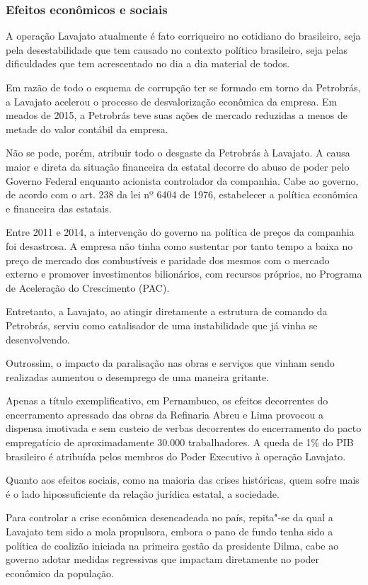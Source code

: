 {\subsubsection{Efeitos econômicos e sociais}

A operação Lavajato atualmente é fato corriqueiro no cotidiano do
brasileiro, seja pela desestabilidade que tem causado no contexto
político brasileiro, seja pelas dificuldades que tem acrescentado no dia
a dia material de todos.

Em razão de todo o esquema de corrupção ter se formado em torno da
Petrobrás, a Lavajato acelerou o processo de desvalorização econômica da
empresa. Em meados de 2015, a Petrobrás teve suas ações de mercado
reduzidas a menos de metade do valor contábil da empresa.

Não se pode, porém, atribuir todo o desgaste da Petrobrás à Lavajato. A
causa maior e direta da situação financeira da estatal decorre do abuso
de poder pelo Governo Federal enquanto acionista controlador da
companhia. Cabe ao governo, de acordo com o art. 238 da lei nº 6404 de
1976, estabelecer a política econômica e financeira das estatais.

Entre 2011 e 2014, a intervenção do governo na política de preços da
companhia foi desastrosa. A empresa não tinha como sustentar por tanto
tempo a baixa no preço de mercado dos combustíveis e paridade dos mesmos
com o mercado externo e promover investimentos bilionários, com recursos
próprios, no Programa de Aceleração do Crescimento (PAC).

Entretanto, a Lavajato, ao atingir diretamente a estrutura de comando da
Petrobrás, serviu como catalisador de uma instabilidade que já vinha se
desenvolvendo.

Outrossim, o impacto da paralisação nas obras e serviços que vinham
sendo realizadas aumentou o desemprego de uma maneira gritante.

Apenas a título exemplificativo, em Pernambuco, os efeitos decorrentes
do encerramento apressado das obras da Refinaria Abreu e Lima provocou a
dispensa imotivada e sem custeio de verbas decorrentes do encerramento
do pacto empregatício de aproximadamente 30.000 trabalhadores. A queda
de 1\% do PIB brasileiro é atribuída pelos membros do Poder Executivo à
operação Lavajato.

Quanto aos efeitos sociais, como na maioria das crises históricas, quem
sofre mais é o lado hipossuficiente da relação jurídica estatal, a
sociedade.

Para controlar a crise econômica desencadeada no país, repita"-se da qual
a Lavajato tem sido a mola propulsora, embora o pano de fundo tenha sido
a política de coalizão iniciada na primeira gestão da presidente Dilma,
cabe ao governo adotar medidas regressivas que impactam diretamente no
poder econômico da população.

}
